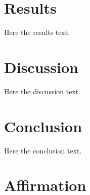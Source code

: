 \documentclass[12pt,a4paper]{cau_thesis}
\begin{document}
\chapter{Results}
\label{ch:results}

Here the results text.
\chapter{Discussion}
\label{ch:discussion}

Here the discussion text.
\chapter{Conclusion}
\label{ch:conclusion}

Here the conclusion text.


\chapter*{Affirmation} %
\markboth{~}{} %

\end{document}
